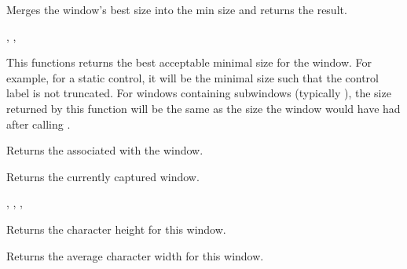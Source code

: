 \label{wxwindowgetbestfittingsize}


Merges the window's best size into the min size and returns the result.


,\rtfsp
{},\rtfsp
{}


\label{wxwindowgetbestsize}


This functions returns the best acceptable minimal size for the window. For
example, for a static control, it will be the minimal size such that the
control label is not truncated. For windows containing subwindows (typically
), the size returned by this function will be the
same as the size the window would have had after calling
.


\label{wxwindowgetcaret}


Returns the  associated with the window.


\label{wxwindowgetcapture}


Returns the currently captured window.


,
,
,


\label{wxwindowgetcharheight}


Returns the character height for this window.


\label{wxwindowgetcharwidth}


Returns the average character width for this window.


